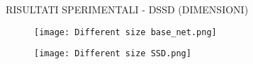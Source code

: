 \begin{frame}{RISULTATI SPERIMENTALI - DSSD (DIMENSIONI)}
\begin{minipage}{\linewidth}
\begin{minipage}{0.45\linewidth}
\begin{figure}
                \texttt{[image: Different size base\_net.png]}
                \centering
            \end{figure}
        \end{minipage}
        \begin{minipage}{0.45\linewidth}
            \begin{figure}
                \centering
                \texttt{[image: Different size SSD.png]}
                \centering
            \end{figure}
        \end{minipage}
    \end{minipage}  
\end{frame}

